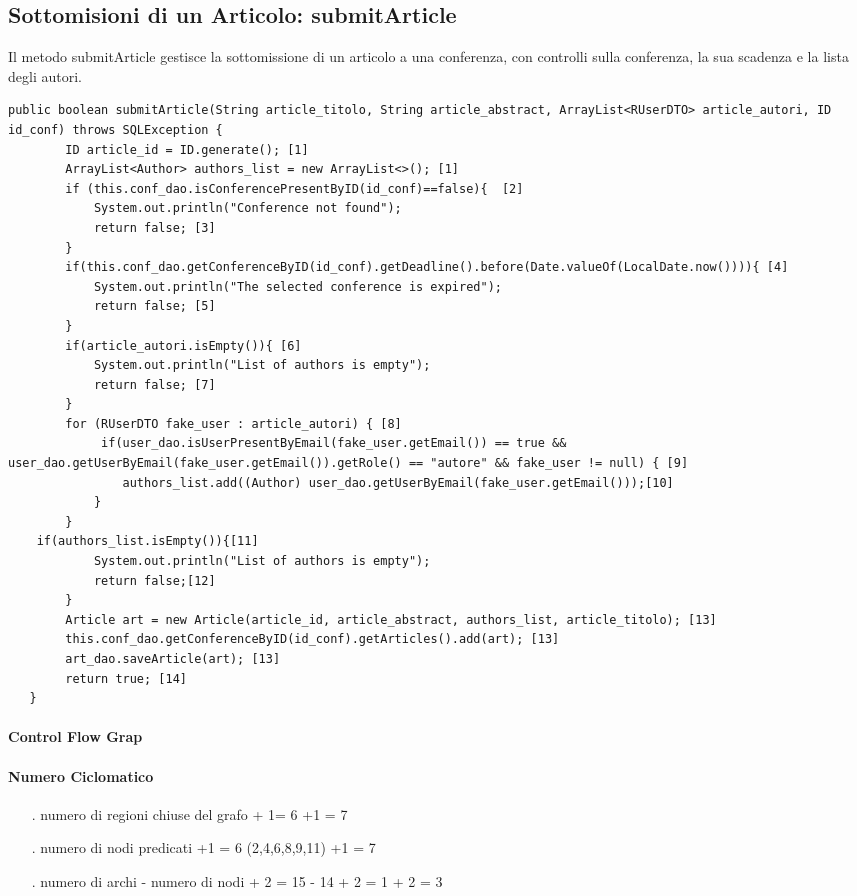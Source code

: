 \subsection{Sottomisioni di un Articolo: submitArticle}
Il metodo submitArticle gestisce la sottomissione di un articolo a una conferenza, con controlli sulla conferenza, la sua scadenza e la lista degli autori.
\begin{lstlisting}
public boolean submitArticle(String article_titolo, String article_abstract, ArrayList<RUserDTO> article_autori, ID id_conf) throws SQLException { 
        ID article_id = ID.generate(); [1]
        ArrayList<Author> authors_list = new ArrayList<>(); [1]
        if (this.conf_dao.isConferencePresentByID(id_conf)==false){  [2]
            System.out.println("Conference not found");
            return false; [3]
        }
        if(this.conf_dao.getConferenceByID(id_conf).getDeadline().before(Date.valueOf(LocalDate.now()))){ [4]
            System.out.println("The selected conference is expired");
            return false; [5]
        }
        if(article_autori.isEmpty()){ [6]
            System.out.println("List of authors is empty");
            return false; [7]
        }
        for (RUserDTO fake_user : article_autori) { [8]
             if(user_dao.isUserPresentByEmail(fake_user.getEmail()) == true && user_dao.getUserByEmail(fake_user.getEmail()).getRole() == "autore" && fake_user != null) { [9]
                authors_list.add((Author) user_dao.getUserByEmail(fake_user.getEmail()));[10]
            }
        }
	if(authors_list.isEmpty()){[11]
            System.out.println("List of authors is empty");
            return false;[12]
        }
        Article art = new Article(article_id, article_abstract, authors_list, article_titolo); [13]
        this.conf_dao.getConferenceByID(id_conf).getArticles().add(art); [13]
        art_dao.saveArticle(art); [13]
        return true; [14]
   } 
\end{lstlisting} 
\paragraph{Control Flow Grap}
\paragraph{Numero Ciclomatico}
\begin{itemize}
\item[.] numero di regioni chiuse del grafo + 1= 6 +1 = 7
\item[.] numero di nodi predicati +1 = 6 (2,4,6,8,9,11) +1 = 7
\item[.] numero di archi - numero di nodi + 2 = 15 - 14 + 2 = 1 + 2 = 3  
\end{itemize}
